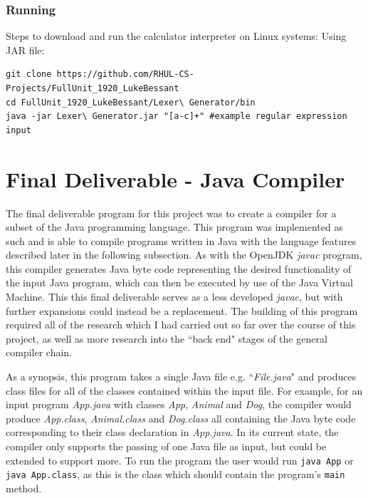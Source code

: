 \documentclass[a4paper, 11pt]{article}
\begin{document}
\subsubsection{Running}
Steps to download and run the calculator interpreter on Linux systems: Using JAR file:
\begin{verbatim}
git clone https://github.com/RHUL-CS-Projects/FullUnit_1920_LukeBessant
cd FullUnit_1920_LukeBessant/Lexer\ Generator/bin
java -jar Lexer\ Generator.jar "[a-c]+" #example regular expression input
\end{verbatim}


















\newpage
\newpage\section{Final Deliverable - Java Compiler}
The final deliverable program for this project was to create a compiler for a subset of the Java programming language. This program was implemented as such and is able to compile programs written in Java with the language features described later in the following subsection. As with the OpenJDK\cite{OpenJDK} \textit{javac} program, this compiler generates Java byte code representing the desired functionality of the input Java program, which can then be executed by use of the Java Virtual Machine. This this final deliverable serves as a less developed \textit{javac}, but with further expansions could instead be a replacement. The building of this program required all of the research which I had carried out so far over the course of this project, as well as more research into the ``back end" stages of the general compiler chain. 

As a synopsis, this program takes a single Java file e.g. ``\textit{File.java}" and produces class files for all of the classes contained within the input file. For example, for an input program \textit{App.java} with classes \textit{App}, \textit{Animal} and \textit{Dog}, the compiler would produce \textit{App.class}, \textit{Animal.class} and \textit{Dog.class} all containing the Java byte code corresponding to their class declaration in \textit{App.java}. In its current state, the compiler only supports the passing of one Java file as input, but could be extended to support more. To run the program the user would run \texttt{java App} or \texttt{java App.class}, as this is the class which should contain the program's \texttt{main} method.
\end{document}
